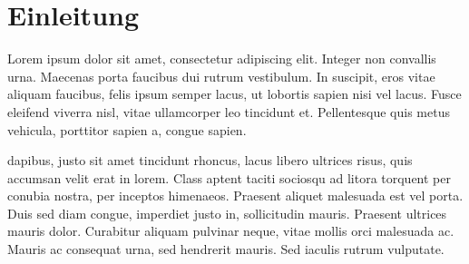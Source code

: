 \section{Einleitung}
\cite{fridman2019avt} Lorem ipsum dolor sit amet, consectetur adipiscing elit. Integer non convallis urna. Maecenas porta faucibus dui rutrum vestibulum. In suscipit, eros vitae aliquam faucibus, felis ipsum semper lacus, ut lobortis sapien nisi vel lacus. Fusce eleifend viverra nisl, vitae ullamcorper leo tincidunt et. Pellentesque quis metus vehicula, porttitor sapien a, congue sapien.

\cite{smith2015automated} dapibus, justo sit amet tincidunt rhoncus, lacus libero ultrices risus, quis accumsan velit erat in lorem. Class aptent taciti sociosqu ad litora torquent per conubia nostra, per inceptos himenaeos. Praesent aliquet malesuada est vel porta. Duis sed diam congue, imperdiet justo in, sollicitudin mauris. Praesent ultrices mauris dolor. Curabitur aliquam pulvinar neque, vitae mollis orci malesuada ac. Mauris ac consequat urna, sed hendrerit mauris. Sed iaculis rutrum vulputate. 
